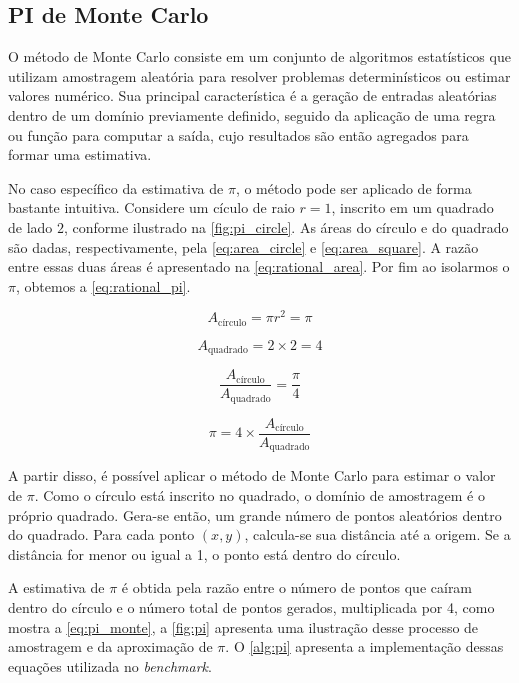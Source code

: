\subsection{PI de Monte Carlo}\label{subsec:pi}

O método de Monte Carlo consiste em um conjunto de algoritmos estatísticos que utilizam amostragem aleatória para resolver problemas determinísticos ou estimar valores numérico. Sua principal característica é a geração de entradas aleatórias dentro de um domínio previamente definido, seguido da aplicação de uma regra ou função para computar a saída, cujo resultados são então agregados para formar uma estimativa.

No caso específico da estimativa de $\pi$, o método pode ser aplicado de forma bastante intuitiva. Considere um cículo de raio $r = 1$, inscrito em um quadrado de lado $2$, conforme ilustrado na \autoref{fig:pi_circle}. As áreas do círculo e do quadrado são dadas, respectivamente, pela \autoref{eq:area_circle} e \autoref{eq:area_square}. A razão entre essas duas áreas é apresentado na \autoref{eq:rational_area}. Por fim ao isolarmos o $\pi$, obtemos a \autoref{eq:rational_pi}.

\begin{equation}
	\label{eq:area_circle}
	A_{\text{círculo}} = \pi r^2 = \pi
\end{equation}

\begin{equation}
	\label{eq:area_square}
	A_{\text{quadrado}} = 2 \times 2 = 4
\end{equation}

\begin{equation}
	\label{eq:rational_area}
	\frac{A_{\text{círculo}}}{A_{\text{quadrado}}} = \frac{\pi}{4}
\end{equation}

\begin{equation}
	\label{eq:rational_pi}
	\pi = 4 \times \frac{A_{\text{círculo}}}{A_{\text{quadrado}}}
\end{equation}

A partir disso, é possível aplicar o método de Monte Carlo para estimar o valor de $\pi$. Como o círculo está inscrito no quadrado, o domínio de amostragem é o próprio quadrado. Gera-se então, um grande número de pontos aleatórios dentro do quadrado. Para cada ponto $(x, y)$, calcula-se sua distância até a origem. Se a distância for menor ou igual a 1, o ponto está dentro do círculo.

A estimativa de $\pi$ é obtida pela razão entre o número de pontos que caíram dentro do círculo e o número total de pontos gerados, multiplicada por 4, como mostra a \autoref{eq:pi_monte}, a \autoref{fig:pi} apresenta uma ilustração desse processo de amostragem e da aproximação de $\pi$. O \autoref{alg:pi} apresenta a implementação dessas equações utilizada no \textit{benchmark}.

